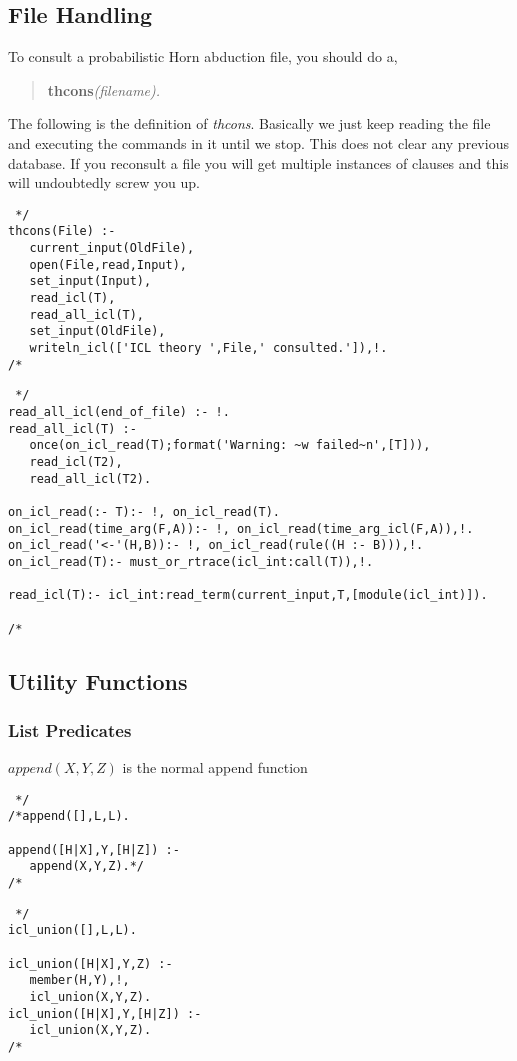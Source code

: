 \documentclass[11pt,fleqn]{article}
\begin{document}
\subsection{File Handling}
To consult a probabilistic Horn abduction file, you should do a,
\begin{verse}
{\bf thcons}\em (filename).
\end{verse}
The following is the definition of {\em thcons}. Basically we just
keep reading the file and executing the commands in it until we stop.
This does not clear any previous database. If you reconsult a file you
will get multiple instances of clauses and this will undoubtedly screw you up.
\begin{verbatim} */
thcons(File) :-
   current_input(OldFile),
   open(File,read,Input),
   set_input(Input),
   read_icl(T),
   read_all_icl(T),
   set_input(OldFile),
   writeln_icl(['ICL theory ',File,' consulted.']),!.
/* \end{verbatim}
\begin{verbatim} */
read_all_icl(end_of_file) :- !.
read_all_icl(T) :-
   once(on_icl_read(T);format('Warning: ~w failed~n',[T])),
   read_icl(T2),
   read_all_icl(T2).

on_icl_read(:- T):- !, on_icl_read(T).
on_icl_read(time_arg(F,A)):- !, on_icl_read(time_arg_icl(F,A)),!.
on_icl_read('<-'(H,B)):- !, on_icl_read(rule((H :- B))),!.
on_icl_read(T):- must_or_rtrace(icl_int:call(T)),!.

read_icl(T):- icl_int:read_term(current_input,T,[module(icl_int)]).

/* \end{verbatim}

\subsection{Utility Functions}
\subsubsection{List Predicates}
$append(X,Y,Z)$ is the normal append function
\begin{verbatim} */
/*append([],L,L).

append([H|X],Y,[H|Z]) :-
   append(X,Y,Z).*/
/* \end{verbatim}
\begin{verbatim} */
icl_union([],L,L).

icl_union([H|X],Y,Z) :-
   member(H,Y),!,
   icl_union(X,Y,Z).
icl_union([H|X],Y,[H|Z]) :-
   icl_union(X,Y,Z).
/* \end{verbatim}
\end{document}
